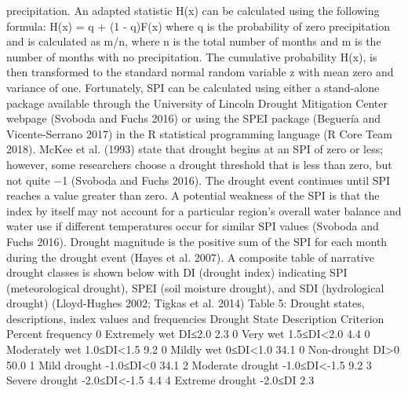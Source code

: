\documentclass[12pt,twoside]{reedthesis}
\theoremstyle{definition}
\theoremstyle{definition}
\theoremstyle{definition}
\theoremstyle{remark}
\begin{document}
precipitation. An adapted statistic H(x) can be calculated using the
following formula: H(x) = q + (1 - q)F(x) where q is the probability of
zero precipitation and is calculated as m/n, where n is the total number
of months and m is the number of months with no precipitation. The
cumulative probability H(x), is then transformed to the standard normal
random variable z with mean zero and variance of one. Fortunately, SPI
can be calculated using either a stand-alone package available through
the University of Lincoln Drought Mitigation Center webpage (Svoboda and
Fuchs 2016) or using the SPEI package (Beguería and Vicente-Serrano
2017) in the R statistical programming language (R Core Team 2018).
McKee et al. (1993) state that drought begins at an SPI of zero or less;
however, some researchers choose a drought threshold that is less than
zero, but not quite −1 (Svoboda and Fuchs 2016). The drought event
continues until SPI reaches a value greater than zero. A potential
weakness of the SPI is that the index by itself may not account for a
particular region's overall water balance and water use if different
temperatures occur for similar SPI values (Svoboda and Fuchs 2016).
Drought magnitude is the positive sum of the SPI for each month during
the drought event (Hayes et al. 2007). A composite table of narrative
drought classes is shown below with DI (drought index) indicating SPI
(meteorological drought), SPEI (soil moisture drought), and SDI
(hydrological drought) (Lloyd-Hughes 2002; Tigkas et al. 2014) Table 5:
Drought states, descriptions, index values and frequencies Drought State
Description Criterion Percent frequency 0 Extremely wet DI≤2.0 2.3 0
Very wet 1.5≤DI\textless{}2.0 4.4 0 Moderately wet 1.0≤DI\textless{}1.5
9.2 0 Mildly wet 0≤DI\textless{}1.0 34.1 0 Non-drought DI\textgreater{}0
50.0 1 Mild drought -1.0≤DI\textless{}0 34.1 2 Moderate drought
-1.0≤DI\textless{}-1.5 9.2 3 Severe drought -2.0≤DI\textless{}-1.5 4.4 4
Extreme drought -2.0≤DI 2.3
\end{document}
